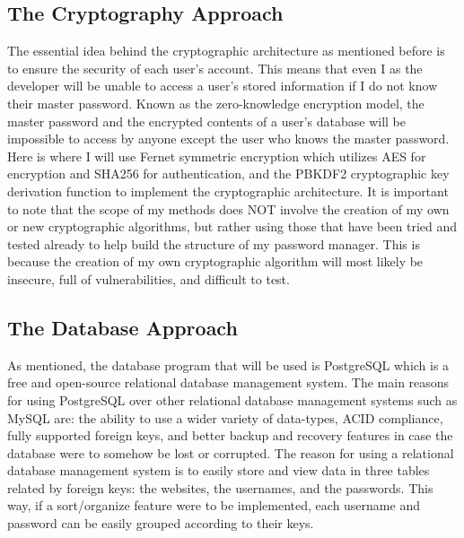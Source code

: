 \documentclass[10pt,twocolumn]{article}
\begin{document}
\subsection{The Cryptography Approach}
The essential idea behind the cryptographic architecture as mentioned before is to ensure the security of each user's account. This means that even I as the developer will be unable to access a user's stored information if I do not know their master password. Known as the zero-knowledge encryption model\cite{Fremery_2023}, the master password and the encrypted contents of a user's database will be impossible to access by anyone except the user who knows the master password. Here is where I will use Fernet symmetric encryption which utilizes AES for encryption and SHA256 for authentication, and the PBKDF2 cryptographic key derivation function to implement the cryptographic architecture. It is important to note that the scope of my methods does NOT involve the creation of my own or new cryptographic algorithms, but rather using those that have been tried and tested already to help build the structure of my password manager. This is because the creation of my own cryptographic algorithm will most likely be insecure, full of vulnerabilities, and difficult to test.

\subsection{The Database Approach}
As mentioned, the database program that will be used is PostgreSQL which is a free and open-source relational database management system. The main reasons for using PostgreSQL over other relational database management systems such as MySQL are: the ability to use a wider variety of data-types, ACID compliance, fully supported foreign keys, and better backup and recovery features in case the database were to somehow be lost or corrupted\cite{Smallcombe_2019}. The reason for using a relational database management system is to easily store and view data in three tables related by foreign keys: the websites, the usernames, and the passwords. This way, if a sort/organize feature were to be implemented, each username and password can be easily grouped according to their keys.
\end{document}
